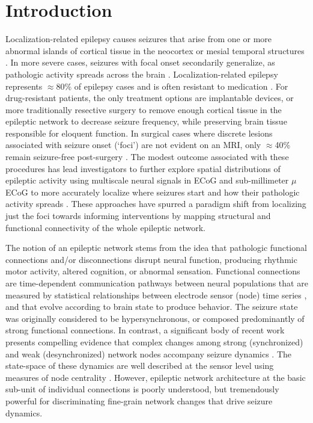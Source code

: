\section{Introduction}
Localization-related epilepsy causes seizures that arise from one or more abnormal islands of cortical tissue in the neocortex or mesial temporal structures \cite{siegel2001medically}. In more severe cases, seizures with focal onset secondarily generalize, as pathologic activity spreads across the brain \cite{kutsy1999ictal}. Localization-related epilepsy represents $\approx$80\% of epilepsy cases and is often resistant to medication \cite{french2007refractory}. For drug-resistant patients, the only treatment options are implantable devices, or more traditionally resective surgery to remove enough cortical tissue in the epileptic network to decrease seizure frequency, while preserving brain tissue responsible for eloquent function. In surgical cases where discrete lesions associated with seizure onset (`foci') are not evident on an MRI, only $\approx$40\% remain seizure-free post-surgery \cite{french2007refractory}. The modest outcome associated with these procedures has lead investigators to further explore spatial distributions of epileptic activity using multiscale neural signals in ECoG and sub-millimeter $\mu$ECoG to more accurately localize where seizures start and how their pathologic activity spreads \cite{worrell2008high-frequency, schevon2009spatial, stead2010microseizures, viventi2011flexible, feldt_muldoon2013spatially, weiss2013ictal}. These approaches have spurred a paradigm shift from localizing just the foci towards informing interventions by mapping structural and functional connectivity of the whole epileptic network.

The notion of an epileptic network stems from the idea that pathologic functional connections and/or disconnections disrupt neural function, producing rhythmic motor activity, altered cognition, or abnormal sensation. Functional connections are time-dependent \cite{hutchison2013dynamic} communication pathways between neural populations that are measured by statistical relationships between electrode sensor (node) time series \cite{friston2011functional}, and that evolve according to brain state to produce behavior. The seizure state was originally considered to be hypersynchronous, or composed predominantly of strong functional connections. In contrast, a significant body of recent work presents compelling evidence that complex changes among strong (synchronized) and weak (desynchronized) network nodes accompany seizure dynamics \cite{wendling2003epileptic, jerger2005multivariate, schindler2006assessing, schindler2008evolving, kramer2010coalescence, jiruska2012synchronization}. The state-space of these dynamics are well described at the sensor level using measures of node centrality \cite{rummel2013systems-level, burns2014network}. However, epileptic network architecture at the basic sub-unit of individual connections is poorly understood, but tremendously powerful for discriminating fine-grain network changes that drive seizure dynamics.

